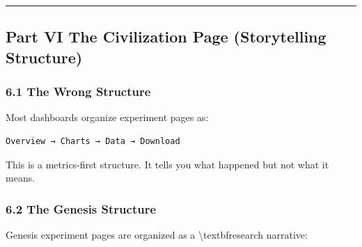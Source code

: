 \documentclass[11pt,a4paper]{article}
\begin{document}
\noindent\rule{\textwidth}{0.4pt}

\subsection*{Part VI  The Civilization Page (Storytelling Structure)}

\subsubsection*{6.1 The Wrong Structure}

Most dashboards organize experiment pages as:

\begin{lstlisting}[language=Python]
Overview → Charts → Data → Download
\end{lstlisting}

This is a metrics-first structure. It tells you what happened but not what it means.

\subsubsection*{6.2 The Genesis Structure}

Genesis experiment pages are organized as a \textbackslash{}textbf{research narrative}:
\end{document}
